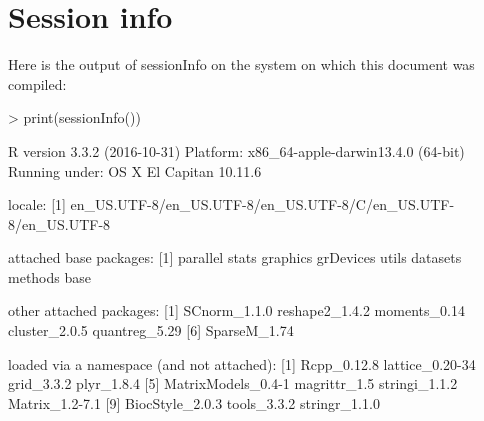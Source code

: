 \documentclass{article}
\begin{document}
\section{Session info}
Here is the output of sessionInfo on the system on which this document was compiled:
\begin{Schunk}
\begin{Sinput}
>   print(sessionInfo())
\end{Sinput}
\begin{Soutput}
R version 3.3.2 (2016-10-31)
Platform: x86_64-apple-darwin13.4.0 (64-bit)
Running under: OS X El Capitan 10.11.6

locale:
[1] en_US.UTF-8/en_US.UTF-8/en_US.UTF-8/C/en_US.UTF-8/en_US.UTF-8

attached base packages:
[1] parallel  stats     graphics  grDevices utils     datasets  methods   base     

other attached packages:
[1] SCnorm_1.1.0   reshape2_1.4.2 moments_0.14   cluster_2.0.5  quantreg_5.29 
[6] SparseM_1.74  

loaded via a namespace (and not attached):
 [1] Rcpp_0.12.8        lattice_0.20-34    grid_3.3.2         plyr_1.8.4        
 [5] MatrixModels_0.4-1 magrittr_1.5       stringi_1.1.2      Matrix_1.2-7.1    
 [9] BiocStyle_2.0.3    tools_3.3.2        stringr_1.1.0     
\end{Soutput}
\end{Schunk}
  
  \vspace{1cm}
%


%
\end{document}
